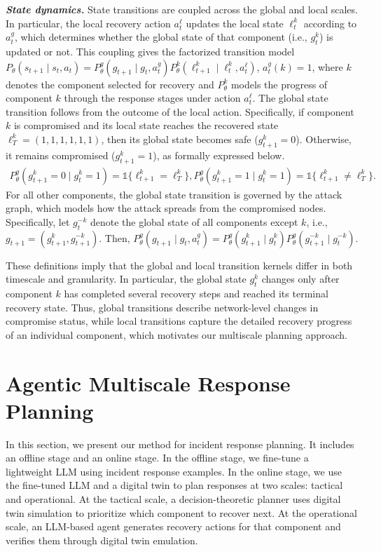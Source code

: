 \documentclass[runningheads,10pt]{llncs}
\begin{document}
\noindent\textit{\textbf{State dynamics.}} State transitions are coupled across the global and local scales. In particular, the local recovery action $a_t^{\ell}$ updates the local state  $\ell_t^k$ according to $a_t^g$, which determines whether the global state of that component (i.e., $g^k_t$) is updated or not. This coupling gives the factorized transition model $ P_\theta(s_{t+1}\mid s_t, a_t)=P^g_\theta(g_{t+1}\mid g_t, a^g_t)P_\theta^k(\ell^k_{t+1}\mid \ell^k_t, a^\ell_t)$, $a_t^g(k)=1$,
where $k$ denotes the component selected for recovery and $P_{\theta}^k$ models the progress of component $k$ through the response stages under action $a_t^{\ell}$. The global state transition follows from the outcome of the local action. Specifically, if component $k$ is compromised and its local state reaches the recovered state $\ell^k_T = (1,1,1,1,1,1)$, then its global state becomes safe ($g^k_{t+1}=0$). Otherwise, it remains compromised ($g^k_{t+1}=1$), as formally expressed below.
\begin{align*}
P_{\theta}^g(g^k_{t+1} = 0 \mid g^k_t = 1) = \mathds{1}\{\ell_{t+1}^{k} = \ell^k_T\},
P_{\theta}^g(g^k_{t+1} = 1 \mid g^k_t = 1) = \mathds{1}\{\ell_{t+1}^{k} \neq \ell^k_T\}.
\end{align*}
For all other components, the global state transition is governed by the attack graph, which models how the attack spreads from the compromised nodes. Specifically, let $g^{-k}_t$ denote the global state of all components except $k$, i.e., $g_{t+1}=(g^k_{t+1}, g^{-k}_{t+1})$. Then, $P_{\theta}^g(g_{t+1} \mid g_t, a^g_t) = P_{\theta}^{g}(g^k_{t+1} \mid g^k_t)P_{\theta}^{g}(g_{t+1}^{-k} \mid g^{-k}_t)$.


These definitions imply that the global and local transition kernels differ in both timescale and granularity. In particular, the global state $g^k_t$ changes only after component $k$ has completed several recovery steps and reached its terminal recovery state. Thus, global transitions describe network-level changes in compromise status, while local transitions capture the detailed recovery progress of an individual component, which motivates our multiscale planning approach.

\section{Agentic Multiscale Response Planning}
In this section, we present our method for incident response planning. It includes an offline stage and an online stage. In the offline stage, we fine-tune a lightweight LLM using incident response examples. In the online stage, we use the fine-tuned LLM and a digital twin to plan responses at two scales: tactical and operational. At the tactical scale, a decision-theoretic planner uses digital twin simulation to prioritize which component to recover next. At the operational scale, an LLM-based agent generates recovery actions for that component and verifies them through digital twin emulation. 
\end{document}
